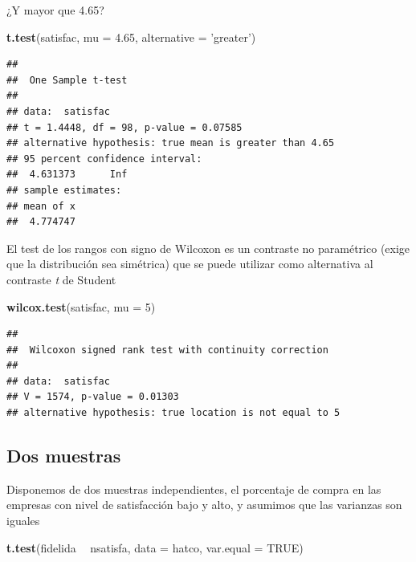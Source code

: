 \documentclass[]{book}
\newenvironment{Shaded}{\begin{snugshade}}{\end{snugshade}}
\newcommand{\KeywordTok}[1]{\textcolor[rgb]{0.13,0.29,0.53}{\textbf{#1}}}
\newcommand{\DataTypeTok}[1]{\textcolor[rgb]{0.13,0.29,0.53}{#1}}
\newcommand{\DecValTok}[1]{\textcolor[rgb]{0.00,0.00,0.81}{#1}}
\newcommand{\FloatTok}[1]{\textcolor[rgb]{0.00,0.00,0.81}{#1}}
\newcommand{\StringTok}[1]{\textcolor[rgb]{0.31,0.60,0.02}{#1}}
\newcommand{\OtherTok}[1]{\textcolor[rgb]{0.56,0.35,0.01}{#1}}
\newcommand{\OperatorTok}[1]{\textcolor[rgb]{0.81,0.36,0.00}{\textbf{#1}}}
\newcommand{\NormalTok}[1]{#1}
\begin{document}
¿Y mayor que 4.65?

\begin{Shaded}
\begin{Highlighting}[]
\KeywordTok{t.test}\NormalTok{(satisfac, }\DataTypeTok{mu =} \FloatTok{4.65}\NormalTok{, }\DataTypeTok{alternative =} \StringTok{'greater'}\NormalTok{)}
\end{Highlighting}
\end{Shaded}

\begin{verbatim}
## 
##  One Sample t-test
## 
## data:  satisfac
## t = 1.4448, df = 98, p-value = 0.07585
## alternative hypothesis: true mean is greater than 4.65
## 95 percent confidence interval:
##  4.631373      Inf
## sample estimates:
## mean of x 
##  4.774747
\end{verbatim}

El test de los rangos con signo de Wilcoxon es un contraste no
paramétrico (exige que la distribución sea simétrica) que se puede
utilizar como alternativa al contraste \emph{t} de Student

\begin{Shaded}
\begin{Highlighting}[]
\KeywordTok{wilcox.test}\NormalTok{(satisfac, }\DataTypeTok{mu =} \DecValTok{5}\NormalTok{)}
\end{Highlighting}
\end{Shaded}

\begin{verbatim}
## 
##  Wilcoxon signed rank test with continuity correction
## 
## data:  satisfac
## V = 1574, p-value = 0.01303
## alternative hypothesis: true location is not equal to 5
\end{verbatim}

\subsection{Dos muestras}\label{dos-muestras}

Disponemos de dos muestras independientes, el porcentaje de compra en
las empresas con nivel de satisfacción bajo y alto, y asumimos que las
varianzas son iguales

\begin{Shaded}
\begin{Highlighting}[]
\KeywordTok{t.test}\NormalTok{(fidelida }\OperatorTok{~}\StringTok{ }\NormalTok{nsatisfa, }\DataTypeTok{data =}\NormalTok{ hatco, }\DataTypeTok{var.equal =} \OtherTok{TRUE}\NormalTok{)}
\end{Highlighting}
\end{Shaded}
\end{document}
